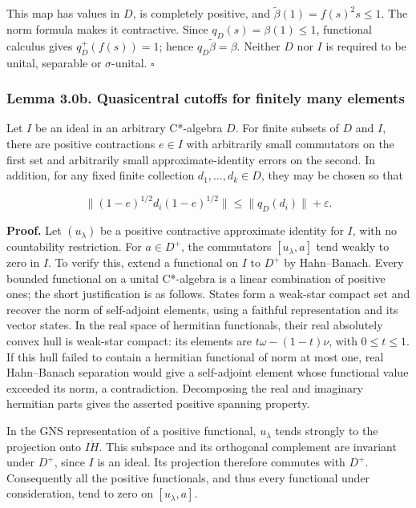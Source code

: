 \documentclass[
  11pt,
]{article}
\begin{document}
This map has values in \(D\), is completely positive, and
\(\widetilde\beta(1)=f(s)^2s\leq1\). The norm formula makes it
contractive. Since \(q_D(s)=\beta(1)\leq1\), functional calculus gives
\(q_D^+(f(s))=1\); hence \(q_D\widetilde\beta=\beta\). Neither \(D\) nor
\(I\) is required to be unital, separable or \(\sigma\)-unital.
\(\square\)

\subsubsection{Lemma 3.0b. Quasicentral cutoffs for finitely many
elements}\label{lemma-3.0b.-quasicentral-cutoffs-for-finitely-many-elements}

Let \(I\) be an ideal in an arbitrary C*-algebra \(D\). For finite
subsets of \(D\) and \(I\), there are positive contractions \(e\in I\)
with arbitrarily small commutators on the first set and arbitrarily
small approximate-identity errors on the second. In addition, for any
fixed finite collection \(d_1,\ldots,d_k\in D\), they may be chosen so
that

\[
\|(1-e)^{1/2}d_i(1-e)^{1/2}\|
\leq\|q_D(d_i)\|+\varepsilon.
\]

\textbf{Proof.} Let \((u_\lambda)\) be a positive contractive
approximate identity for \(I\), with no countability restriction. For
\(a\in D^+\), the commutators \([u_\lambda,a]\) tend weakly to zero in
\(I\). To verify this, extend a functional on \(I\) to \(D^+\) by
Hahn--Banach. Every bounded functional on a unital C*-algebra is a
linear combination of positive ones; the short justification is as
follows. States form a weak-star compact set and recover the norm of
self-adjoint elements, using a faithful representation and its vector
states. In the real space of hermitian functionals, their real
absolutely convex hull is weak-star compact: its elements are
\(t\omega-(1-t)\nu\), with \(0\leq t\leq1\). If this hull failed to
contain a hermitian functional of norm at most one, real Hahn--Banach
separation would give a self-adjoint element whose functional value
exceeded its norm, a contradiction. Decomposing the real and imaginary
hermitian parts gives the asserted positive spanning property.

In the GNS representation of a positive functional, \(u_\lambda\) tends
strongly to the projection onto \(\overline{IH}\). This subspace and its
orthogonal complement are invariant under \(D^+\), since \(I\) is an
ideal. Its projection therefore commutes with \(D^+\). Consequently all
the positive functionals, and thus every functional under consideration,
tend to zero on \([u_\lambda,a]\).
\end{document}
